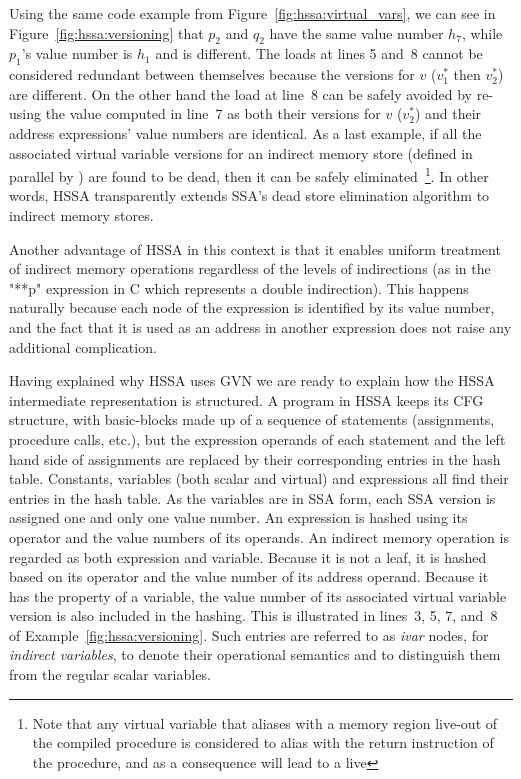 Using the same code example from Figure~\ref{fig:hssa:virtual_vars}, we can see in Figure~\ref{fig:hssa:versioning} that
$p_2$ and $q_2$ have the same value number $h_7$, while $p_1$'s value number is
$h_1$ and is different.
The loads at lines 5 and~8 cannot be considered redundant between themselves
because the versions for $v$ ($v_1^*$ then $v_2^*$) are different. 
On the other hand the load at line~8 can be safely avoided by re-using the value
computed in line~7 as both their versions for $v$ ($v_2^*$) and their 
address expressions' value numbers are identical. 
As a last example, if all the associated virtual variable versions for an indirect memory store (defined in parallel by \chifuns) are found to be dead, then it can be safely eliminated~\footnote{Note that any virtual variable that aliases with a memory region live-out of the compiled procedure is considered to alias with the return instruction of the procedure, and as a consequence will lead to a live \mufun}. In other words, HSSA transparently extends SSA's dead store
elimination algorithm to indirect memory stores.

Another advantage of HSSA in this context is that it enables uniform treatment of indirect memory operations regardless of the levels of indirections (as in the "**p" expression in C which represents a double indirection).
This happens naturally because each node of the expression is identified by its value number, and the fact that it is used as an address in another expression does not raise any additional complication.

Having explained why HSSA uses GVN we are ready to explain how the HSSA intermediate representation is structured.
A program in HSSA keeps its CFG structure, with basic-blocks made up of a sequence of statements (assignments, procedure calls, etc.), but the expression
operands of each statement and the left hand side of assignments are replaced 
by their corresponding entries in the hash table. 
Constants, variables (both scalar and virtual) and expressions all find their
entries in the hash table.
As the variables are in SSA form, each SSA version is assigned one and only one
value number.  An expression is hashed using its operator and the value numbers of its operands.
An indirect memory operation is regarded as both expression and variable.
Because it is not a leaf, it is hashed based on its operator and the value
number of its address operand.
Because it has the property of a variable, the value number of its associated
virtual variable version is also included in the hashing.  This is illustrated 
in lines~3, 5, 7, and~8 of Example~\ref{fig:hssa:versioning}.
Such entries are referred to as \emph{ivar} nodes, for \emph{indirect variables}, to denote their operational semantics and to distinguish them from the regular scalar variables. 

